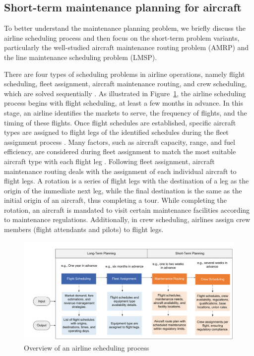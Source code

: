 \subsection{Short-term maintenance planning for aircraft}
\label{subsect:maint_routin_problm}
To better understand the maintenance planning problem, we briefly discuss the airline scheduling process and then focus on the short-term problem variants, particularly the well-studied aircraft maintenance routing problem (AMRP) and the line maintenance scheduling problem (LMSP). 
\color{black}


There are four types of scheduling problems in airline operations, namely flight scheduling, fleet assignment, aircraft maintenance routing, and crew scheduling, which are solved sequentially \citep{barnhart2004airline}.
As illustrated in Figure~\ref{fig:airline_scheduling problem}, the airline scheduling process begins with flight scheduling, at least a few months in advance. In this stage, an airline identifies the markets to serve, the frequency of flights, and the timing of these flights. Once flight schedules are established, specific aircraft types are assigned to flight legs of the identified schedules during the fleet assignment process \citep{clarke1997aircraft}. Many factors, such as aircraft capacity, range, and fuel efficiency, are considered during fleet assignment to match the most suitable aircraft type with each flight leg \citep{gopalan1998aircraft}. Following fleet assignment, aircraft maintenance routing deals with the assignment of each individual aircraft to flight legs. A rotation is a series of flight legs with the destination of a leg as the origin of the immediate next leg, while the final destination is the same as the initial origin of an aircraft, thus completing a tour. While completing the rotation, an aircraft is mandated to visit certain maintenance facilities according to maintenance regulations. Additionally, in crew scheduling, airlines assign crew members (flight attendants and pilots) to flight legs. 


\begin{figure}[htbp]
    \centering
    \includegraphics[width=\linewidth]{airlineschedulingv7.pdf}
    \caption{Overview of an airline scheduling process}
\label{fig:airline_scheduling problem}
\end{figure}

